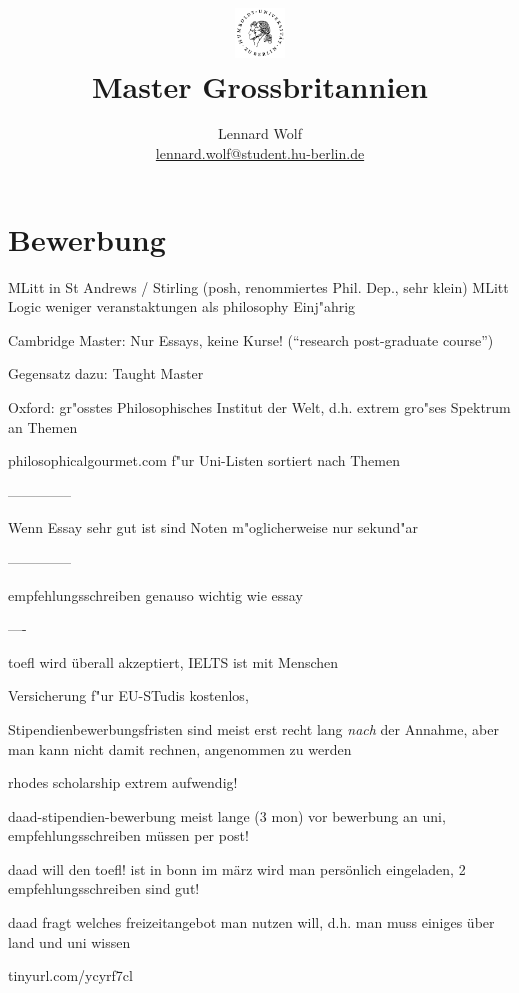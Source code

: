 \documentclass[a4paper]{article}
\date{\vspace{-3ex}}
\begin{document}
\title{
    \vspace{-30pt}
	\includegraphics*[width=0.1\textwidth,left]{ErstesSem/images/hu_logo2.png}\\
	\vspace{-10pt}
	Master Grossbritannien}
\author{Lennard Wolf\\
        \small{\href{mailto:lennard.wolf@student.hu-berlin.de}{lennard.wolf@student.hu-berlin.de}}}
\maketitle
\vspace{-4pt}

\section*{Bewerbung}
\large

MLitt in St Andrews / Stirling (posh, renommiertes Phil. Dep., sehr klein)
MLitt Logic weniger veranstaktungen als philosophy
Einj"ahrig


Cambridge Master: Nur Essays, keine Kurse! ("`research post-graduate course"') 

Gegensatz dazu: Taught Master

Oxford: gr"osstes Philosophisches Institut der Welt, d.h. extrem gro"ses Spektrum an Themen

philosophicalgourmet.com f"ur Uni-Listen sortiert nach Themen  

--------------

Wenn Essay sehr gut ist sind Noten m"oglicherweise nur sekund"ar

--------------

empfehlungsschreiben genauso wichtig wie essay


----

toefl wird überall akzeptiert, IELTS ist mit Menschen



Versicherung f"ur EU-STudis kostenlos, 


Stipendienbewerbungsfristen sind meist erst recht lang \emph{nach} der Annahme, aber man kann nicht damit rechnen, angenommen zu werden

rhodes scholarship extrem aufwendig!


daad-stipendien-bewerbung meist lange (3 mon) vor bewerbung an uni, empfehlungsschreiben müssen per post!

daad will den toefl! ist in bonn im märz wird man persönlich eingeladen, 2 empfehlungsschreiben sind gut!

daad fragt welches freizeitangebot man nutzen will, d.h. man muss einiges über land und uni wissen



tinyurl.com/ycyrf7cl
\end{document}

